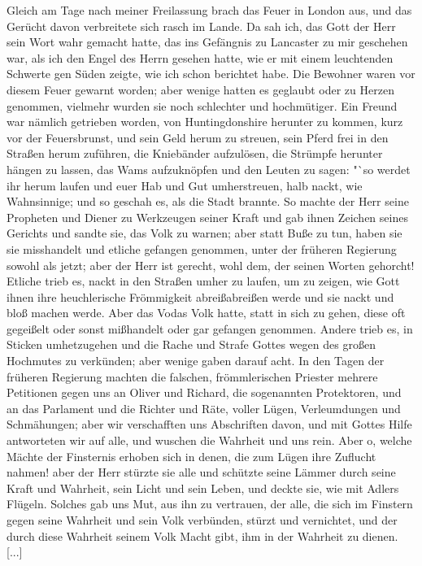 Gleich am Tage nach meiner Freilassung brach das Feuer
in London aus, und das Gerücht davon verbreitete sich rasch im
Lande. Da sah ich, das Gott der Herr sein Wort wahr gemacht
hatte, das ins Gefängnis zu Lancaster zu mir geschehen war, als
ich den Engel des Herrn gesehen hatte, wie er mit einem 
leuchtenden Schwerte gen Süden zeigte, wie ich schon berichtet habe.
Die Bewohner waren vor diesem Feuer gewarnt worden; aber
wenige hatten es geglaubt oder zu Herzen genommen, vielmehr
wurden sie noch schlechter und hochmütiger. Ein Freund war nämlich
getrieben worden, von Huntingdonshire herunter zu kommen, kurz
vor der Feuersbrunst, und sein Geld herum zu streuen, sein Pferd
frei in den Straßen herum zuführen, die Kniebänder aufzulösen,
die Strümpfe herunter hängen zu lassen, das Wams aufzuknöpfen
und den Leuten zu sagen: "`so werdet ihr herum laufen und euer
Hab und Gut umherstreuen, halb nackt, wie Wahnsinnige; und so
geschah es, als die Stadt brannte. So machte der Herr seine
Propheten und Diener zu Werkzeugen seiner Kraft und gab
ihnen Zeichen seines Gerichts und sandte sie, das Volk zu warnen;
aber statt Buße zu tun, haben sie sie misshandelt und etliche
gefangen genommen, unter der früheren Regierung sowohl als
jetzt; aber der Herr ist gerecht, wohl dem, der seinen Worten
gehorcht! Etliche trieb es, nackt in den Straßen umher zu laufen,
um zu zeigen, wie Gott ihnen ihre heuchlerische Frömmigkeit
abreißabreißen werde und sie nackt und bloß machen werde. Aber
das Vodas Volk hatte, statt in sich zu gehen, diese oft gegeißelt oder
sonst mißhandelt oder gar gefangen genommen. Andere trieb es,
in Sticken umhetzugehen und die Rache und Strafe Gottes wegen
des großen Hochmutes zu verkünden; aber wenige gaben darauf
acht. In den Tagen der früheren Regierung machten die falschen,
frömmlerischen Priester mehrere Petitionen gegen uns an Oliver
und Richard, die sogenannten Protektoren, und an das Parlament
und die Richter und Räte, voller Lügen, Verleumdungen und
Schmähungen; aber wir verschafften uns Abschriften davon, und
mit Gottes Hilfe antworteten wir auf alle, und wuschen die
Wahrheit und uns rein. Aber o, welche Mächte der Finsternis erhoben
sich in denen, die zum Lügen ihre Zuflucht nahmen! aber der
Herr stürzte sie alle und schützte seine Lämmer durch seine Kraft
und Wahrheit, sein Licht und sein Leben, und deckte sie, wie mit
Adlers Flügeln. Solches gab uns Mut, aus ihn zu vertrauen,
der alle, die sich im Finstern gegen seine Wahrheit und sein Volk
verbünden, stürzt und vernichtet, und der durch diese Wahrheit 
seinem Volk Macht gibt, ihm in der Wahrheit zu dienen. [...]

